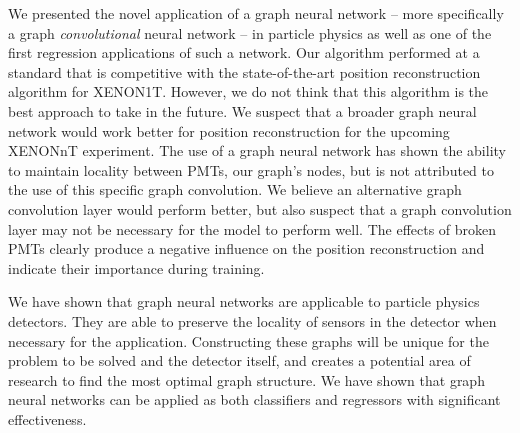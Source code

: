 \documentclass[../thesis.tex]{subfiles}
\begin{document}
We presented the novel application of a graph neural network -- more specifically a graph \textit{convolutional} neural network -- in particle physics as well as one of the first regression applications of such a network.
Our algorithm performed at a standard that is competitive with the state-of-the-art position reconstruction algorithm for XENON1T.
However, we do not think that this algorithm is the best approach to take in the future.
We suspect that a broader graph neural network would work better for position reconstruction for the upcoming XENONnT experiment.
The use of a graph neural network has shown the ability to maintain locality between PMTs, our graph's nodes, but is not attributed to the use of this specific graph convolution.
We believe an alternative graph convolution layer would perform better, but also suspect that a graph convolution layer may not be necessary for the model to perform well.
The effects of broken PMTs clearly produce a negative influence on the position reconstruction and indicate their importance during training.

\par We have shown that graph neural networks are applicable to particle physics detectors.
They are able to preserve the locality of sensors in the detector when necessary for the application.
Constructing these graphs will be unique for the problem to be solved and the detector itself, and creates a potential area of research to find the most optimal graph structure.
We have shown that graph neural networks can be applied as both classifiers and regressors with significant effectiveness.
\end{document}
